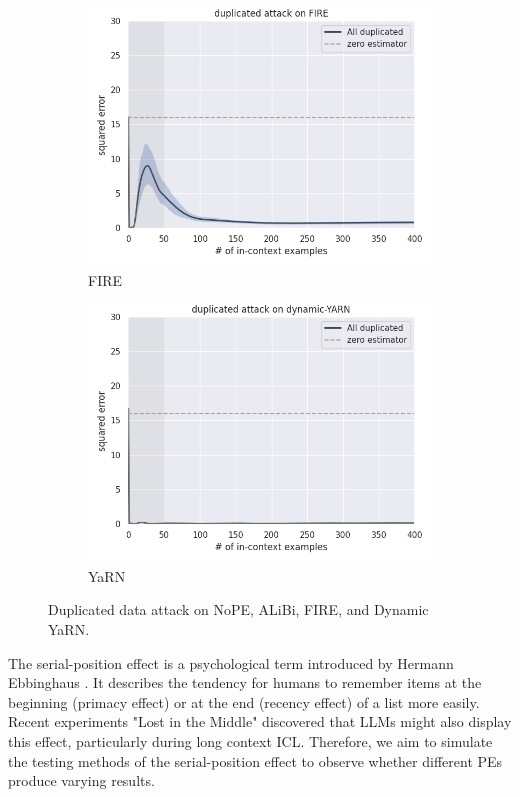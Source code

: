 \documentclass[letterpaper]{article} %
\begin{document}
\begin{figure}[tp]
\begin{subfigure}[t]{0.24\linewidth}
        \includegraphics[width=\linewidth]{AnonymousSubmission/LaTeX/imgs/analysis/fire_alldup.png}
        \caption{FIRE}
    \end{subfigure}
    \begin{subfigure}[t]{0.24\linewidth}
        \includegraphics[width=\linewidth]{AnonymousSubmission/LaTeX/imgs/analysis/dyarn_alldup.png}
        \caption{YaRN}
    \end{subfigure}
    \caption{Duplicated data attack on NoPE, ALiBi, FIRE, and Dynamic YaRN.}
    \label{fig:noise}
\end{figure}

The serial-position effect is a psychological term introduced by Hermann Ebbinghaus \cite{ebbinghaus-2013-memory}. It describes the tendency for humans to remember items at the beginning (primacy effect) or at the end (recency effect) of a list more easily. Recent experiments "Lost in the Middle" \cite{liu-2024-lost} discovered that LLMs might also display this effect, particularly during long context ICL. Therefore, we aim to simulate the testing methods of the serial-position effect to observe whether different PEs produce varying results.
\end{document}
